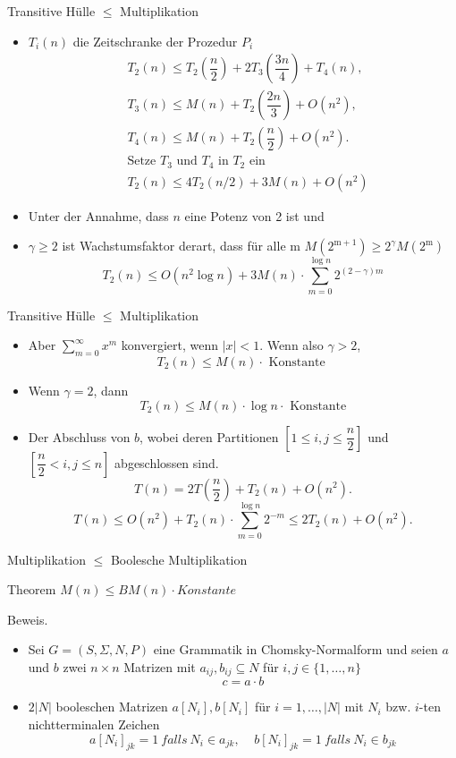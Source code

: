 \documentclass{beamer}
\begin{document}
	\begin{frame}{Transitive Hülle $\le$ Multiplikation}
		\begin{itemize}
			\item $T_i(n)$ die Zeitschranke der Prozedur $P_i$
			$$
			\begin{aligned}
				& T_2(n) \leq T_2(\dfrac{n}{2})+2 T_3(\dfrac{3n}{4})+T_4(n), \\
				& T_3(n) \leq M(n)+T_2(\dfrac{2n}{3})+O\left(n^2\right), \\
				& T_4(n) \leq M(n)+T_2(\dfrac{n}{2})+O\left(n^2\right). \\
				& \text{Setze } T_3 \text{ und } T_4 \text{ in } T_2 \text{ ein }\\
				& T_2(n) \leq 4 T_2(n / 2)+3 M(n)+O\left(n^2\right)
			\end{aligned}
			$$
			\pause
			\item Unter der Annahme, dass $n$ eine Potenz von 2 ist und
			 \item $\gamma \geq 2$ ist Wachstumsfaktor derart, dass für alle m $M\left(2^{\mathrm{m}+1}\right) \geq 2^\gamma M\left(2^{\mathrm{m}}\right)$
			$$
			T_2(n) \leq O\left(n^2 \log n\right)+3 M(n) \cdot \sum_{m=0}^{\log n}2^{(2-\gamma) m}
			$$
		\end{itemize}
	\end{frame}

	\begin{frame}{Transitive Hülle $\le$ Multiplikation}
		\begin{itemize}
			\item Aber $\sum_{m=0}^{\infty }{x^m}$ konvergiert, wenn $|x| < 1$. Wenn also $\gamma  > 2$,
			$$
			T_2(n) \leq M(n) \cdot \text { Konstante }
			$$
			\item 	Wenn $\gamma = 2$, dann
			$$T_2(n) \le M(n) \cdot \log n \cdot \text { Konstante}$$
			\pause
			\item Der Abschluss von $b$, wobei deren Partitionen $[1 \le i,j\le \dfrac{n}{2}]$ und $[\dfrac{n}{2} < i, j\le n]$ abgeschlossen sind.
			$$T(n) = 2T(\dfrac{n}{2}) + T_2(n) + O\left(n^2\right).$$
			$$
			T(n) \leq O\left(n^2\right)+T_2(n) \cdot \sum_{m=0}^{\log n}2^{-m} \leq 2T_2(n) + O\left(n^2\right).
			$$
		\end{itemize}
	\end{frame}

	\begin{frame}{Multiplikation $\le$ Boolesche Multiplikation}
		\begin{block}{Theorem}
			$M(n) \le BM(n) \cdot Konstante$
		\end{block}
		Beweis. 
		\begin{itemize}
			\item Sei $G = (S, \Sigma, N, P)$ eine Grammatik in Chomsky-Normalform und seien $a$ und $b$ zwei $n \times n$ Matrizen mit $a_{ij},b_{ij}\subseteq N$ für $i,j\in\{1,\ldots ,n\}$
			$$c = a\cdot b$$
			\pause
			\item $2|N|$ booleschen Matrizen $a[N_i], b[N_i]$ für $i=1,\ldots,|N|$ mit $N_i$ bzw. $i$-ten nichtterminalen Zeichen 
			$$a[N_i]_{jk} = 1 \ falls \ N_i \in a_{jk}, \ \ \ \ \ b[N_i]_{jk} = 1 \ falls \ N_i \in b_{jk}$$
		\end{itemize}
	\end{frame}
\end{document}
